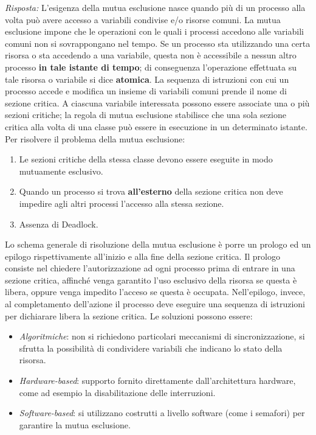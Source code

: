 \documentclass{article}
\newenvironment{solution}
    {\textit{Risposta:}}
    {}
\begin{document}
\begin{solution}
L’esigenza della mutua esclusione nasce quando più di un processo alla volta può avere accesso a variabili condivise e/o risorse comuni.
\newline
La mutua esclusione impone che le operazioni con le quali i processi accedono alle variabili comuni non si sovrappongano nel tempo.
\newline
Se un processo sta utilizzando una certa risorsa o sta accedendo a una variabile, questa non è accessibile a nessun altro processo \textbf{in tale istante di tempo}; di conseguenza l’operazione effettuata su tale risorsa o variabile si dice \textbf{atomica}.
\newline
\newline
La sequenza di istruzioni con cui un processo accede e modifica un insieme di variabili comuni prende il nome di sezione critica.
A ciascuna variabile interessata possono essere associate una o più sezioni critiche; la regola di mutua esclusione stabilisce che una sola sezione critica alla volta di una classe può essere in esecuzione in un determinato istante.
\newline
\newline
Per risolvere il problema della mutua esclusione:
\begin{enumerate}
    \item Le sezioni critiche della stessa classe devono essere eseguite in modo mutuamente esclusivo.
    \item Quando un processo si trova \textbf{all'esterno} della sezione critica non deve impedire agli altri processi l’accesso alla stessa sezione.
    \item Assenza di Deadlock.
\end{enumerate}
Lo schema generale di risoluzione della mutua esclusione è porre un prologo ed un epilogo rispettivamente all’inizio e alla fine della sezione critica.
\newline
Il prologo consiste nel chiedere l’autorizzazione ad ogni processo prima di entrare in una sezione critica, affinché venga garantito l’uso esclusivo della risorsa se questa è libera, oppure venga impedito l’acceso se questa è occupata. 
\newline
Nell’epilogo, invece, al completamento dell’azione il processo deve eseguire una sequenza di istruzioni per dichiarare libera la sezione critica. Le soluzioni possono essere:
\begin{itemize}
    \item \emph{Algoritmiche}: non si richiedono particolari meccanismi di sincronizzazione, si sfrutta la possibilità di condividere variabili che indicano lo stato della risorsa.
    \item \emph{Hardware-based}: supporto fornito direttamente dall’architettura hardware, come ad esempio la disabilitazione delle interruzioni.
    \item \emph{Software-based}: si utilizzano costrutti a livello software (come i semafori) per garantire la mutua esclusione.
\end{itemize}
\end{solution}
\end{document}
